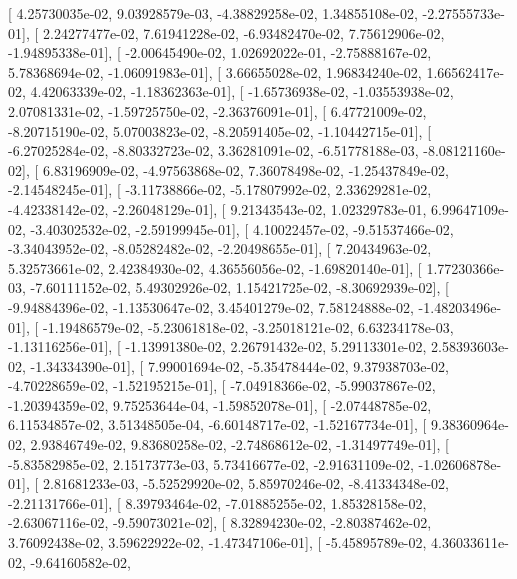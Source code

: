 \documentclass{article}
\begin{document}
       [  4.25730035e-02,   9.03928579e-03,  -4.38829258e-02,
          1.34855108e-02,  -2.27555733e-01],
       [  2.24277477e-02,   7.61941228e-02,  -6.93482470e-02,
          7.75612906e-02,  -1.94895338e-01],
       [ -2.00645490e-02,   1.02692022e-01,  -2.75888167e-02,
          5.78368694e-02,  -1.06091983e-01],
       [  3.66655028e-02,   1.96834240e-02,   1.66562417e-02,
          4.42063339e-02,  -1.18362363e-01],
       [ -1.65736938e-02,  -1.03553938e-02,   2.07081331e-02,
         -1.59725750e-02,  -2.36376091e-01],
       [  6.47721009e-02,  -8.20715190e-02,   5.07003823e-02,
         -8.20591405e-02,  -1.10442715e-01],
       [ -6.27025284e-02,  -8.80332723e-02,   3.36281091e-02,
         -6.51778188e-03,  -8.08121160e-02],
       [  6.83196909e-02,  -4.97563868e-02,   7.36078498e-02,
         -1.25437849e-02,  -2.14548245e-01],
       [ -3.11738866e-02,  -5.17807992e-02,   2.33629281e-02,
         -4.42338142e-02,  -2.26048129e-01],
       [  9.21343543e-02,   1.02329783e-01,   6.99647109e-02,
         -3.40302532e-02,  -2.59199945e-01],
       [  4.10022457e-02,  -9.51537466e-02,  -3.34043952e-02,
         -8.05282482e-02,  -2.20498655e-01],
       [  7.20434963e-02,   5.32573661e-02,   2.42384930e-02,
          4.36556056e-02,  -1.69820140e-01],
       [  1.77230366e-03,  -7.60111152e-02,   5.49302926e-02,
          1.15421725e-02,  -8.30692939e-02],
       [ -9.94884396e-02,  -1.13530647e-02,   3.45401279e-02,
          7.58124888e-02,  -1.48203496e-01],
       [ -1.19486579e-02,  -5.23061818e-02,  -3.25018121e-02,
          6.63234178e-03,  -1.13116256e-01],
       [ -1.13991380e-02,   2.26791432e-02,   5.29113301e-02,
          2.58393603e-02,  -1.34334390e-01],
       [  7.99001694e-02,  -5.35478444e-02,   9.37938703e-02,
         -4.70228659e-02,  -1.52195215e-01],
       [ -7.04918366e-02,  -5.99037867e-02,  -1.20394359e-02,
          9.75253644e-04,  -1.59852078e-01],
       [ -2.07448785e-02,   6.11534857e-02,   3.51348505e-04,
         -6.60148717e-02,  -1.52167734e-01],
       [  9.38360964e-02,   2.93846749e-02,   9.83680258e-02,
         -2.74868612e-02,  -1.31497749e-01],
       [ -5.83582985e-02,   2.15173773e-03,   5.73416677e-02,
         -2.91631109e-02,  -1.02606878e-01],
       [  2.81681233e-03,  -5.52529920e-02,   5.85970246e-02,
         -8.41334348e-02,  -2.21131766e-01],
       [  8.39793464e-02,  -7.01885255e-02,   1.85328158e-02,
         -2.63067116e-02,  -9.59073021e-02],
       [  8.32894230e-02,  -2.80387462e-02,   3.76092438e-02,
          3.59622922e-02,  -1.47347106e-01],
       [ -5.45895789e-02,   4.36033611e-02,  -9.64160582e-02,
\end{document}

